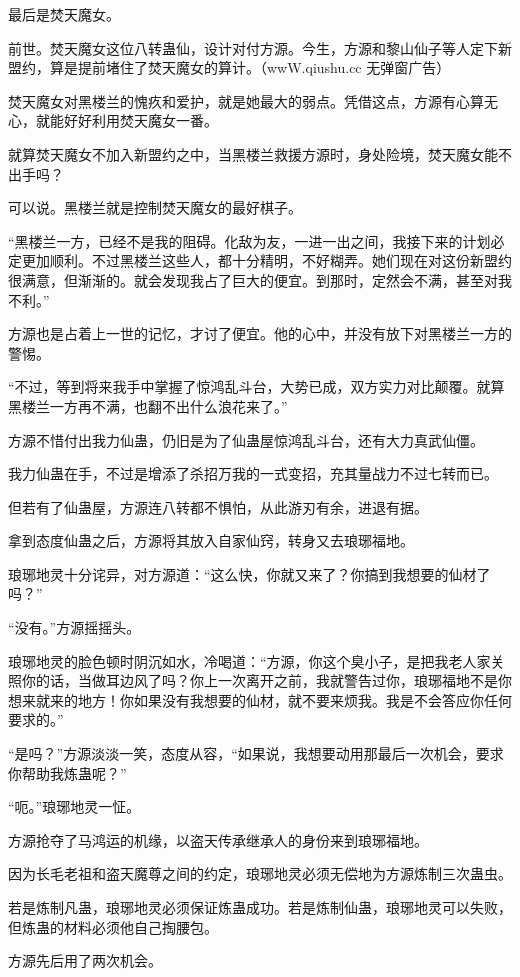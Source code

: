 \begin{this_body}
最后是焚天魔女。

前世。焚天魔女这位八转蛊仙，设计对付方源。今生，方源和黎山仙子等人定下新盟约，算是提前堵住了焚天魔女的算计。（wwW.qiushu.cc 无弹窗广告）

焚天魔女对黑楼兰的愧疚和爱护，就是她最大的弱点。凭借这点，方源有心算无心，就能好好利用焚天魔女一番。

就算焚天魔女不加入新盟约之中，当黑楼兰救援方源时，身处险境，焚天魔女能不出手吗？

可以说。黑楼兰就是控制焚天魔女的最好棋子。

“黑楼兰一方，已经不是我的阻碍。化敌为友，一进一出之间，我接下来的计划必定更加顺利。不过黑楼兰这些人，都十分精明，不好糊弄。她们现在对这份新盟约很满意，但渐渐的。就会发现我占了巨大的便宜。到那时，定然会不满，甚至对我不利。”

方源也是占着上一世的记忆，才讨了便宜。他的心中，并没有放下对黑楼兰一方的警惕。

“不过，等到将来我手中掌握了惊鸿乱斗台，大势已成，双方实力对比颠覆。就算黑楼兰一方再不满，也翻不出什么浪花来了。”

方源不惜付出我力仙蛊，仍旧是为了仙蛊屋惊鸿乱斗台，还有大力真武仙僵。

我力仙蛊在手，不过是增添了杀招万我的一式变招，充其量战力不过七转而已。

但若有了仙蛊屋，方源连八转都不惧怕，从此游刃有余，进退有据。

拿到态度仙蛊之后，方源将其放入自家仙窍，转身又去琅琊福地。

琅琊地灵十分诧异，对方源道：“这么快，你就又来了？你搞到我想要的仙材了吗？”

“没有。”方源摇摇头。

琅琊地灵的脸色顿时阴沉如水，冷喝道：“方源，你这个臭小子，是把我老人家关照你的话，当做耳边风了吗？你上一次离开之前，我就警告过你，琅琊福地不是你想来就来的地方！你如果没有我想要的仙材，就不要来烦我。我是不会答应你任何要求的。”

“是吗？”方源淡淡一笑，态度从容，“如果说，我想要动用那最后一次机会，要求你帮助我炼蛊呢？”

“呃。”琅琊地灵一怔。

方源抢夺了马鸿运的机缘，以盗天传承继承人的身份来到琅琊福地。

因为长毛老祖和盗天魔尊之间的约定，琅琊地灵必须无偿地为方源炼制三次蛊虫。

若是炼制凡蛊，琅琊地灵必须保证炼蛊成功。若是炼制仙蛊，琅琊地灵可以失败，但炼蛊的材料必须他自己掏腰包。

方源先后用了两次机会。


\end{this_body}

